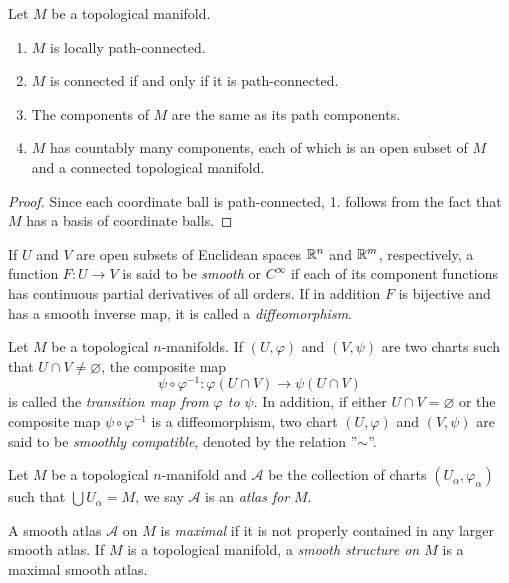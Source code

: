 \begin{proposition}
    Let $M$ be a topological manifold.
    \begin{enumerate}
        \item $M$ is locally path-connected.
        \item $M$ is connected if and only if it is path-connected.
        \item The components of $M$ are the same as its path components.
        \item $M$ has countably many components, each of which is an open subset of $M$ and a connected topological manifold.
    \end{enumerate}
\end{proposition}
\begin{proof}
     Since each coordinate ball is path-connected, 1. follows from the fact that $M$ has a basis of coordinate balls.
\end{proof}
\begin{definition}
    If $U$ and $V$ are open subsets of Euclidean spaces $\mathbb{R}^n$ and $\mathbb{R}^m$, respectively, a function $F: U \to V$ is said to be \textit{smooth} or $C^{\infty}$ if each of its component functions has continuous partial derivatives of all orders. If in addition $F$ is bijective and has a smooth inverse map, it is called a \textit{diffeomorphism}.
\end{definition}
\begin{definition}
    Let $M$ be a topological $n$-manifolds. If $(U,\varphi)$ and $(V,\psi)$ are two charts such that $U \cap V \neq \varnothing$, the composite map
    \[
    \psi \circ \varphi^{-1}: \varphi(U \cap V) \to \psi(U \cap V)
    \]
    is called the \textit{transition map from $\varphi$ to $\psi$}. In addition, if either $U \cap V = \varnothing$ or the composite map $\psi \circ \varphi^{-1}$ is a diffeomorphism, two chart $(U,\varphi)$ and $(V, \psi)$ are said to be \textit{smoothly compatible}, denoted by the relation ''$\sim$''.
\end{definition}
\begin{definition}
    Let $M$ be a topological $n$-manifold and $\mathcal{A}$ be the collection of charts $(U_{\alpha},\varphi_{\alpha})$ such that $\bigcup U_{\alpha} = M$, we say $\mathcal{A}$ is an \textit{atlas for} $M$.
\end{definition}
\begin{definition}
    A smooth atlas $\mathcal{A}$ on $M$ is \textit{maximal} if it is not properly contained in any larger smooth atlas. If $M$ is a topological manifold, a \textit{smooth structure on $M$} is a maximal smooth atlas. 
\end{definition}
